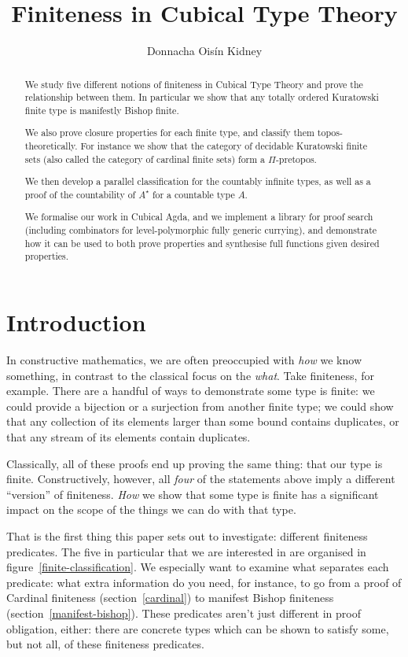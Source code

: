 
\title{Finiteness in Cubical Type Theory}
\author{Donnacha Oisín Kidney}

\maketitle
\begin{abstract}
  We study five different notions of finiteness in Cubical Type Theory and prove
  the relationship between them.
  In particular we show that any totally ordered Kuratowski finite type is
  manifestly Bishop finite.

  We also prove closure properties for each finite type, and classify them
  topos-theoretically.
  For instance we show that the category of decidable Kuratowski finite sets
  (also called the category of cardinal finite sets) form a \(\Pi\)-pretopos.

  We then develop a parallel classification for the countably infinite types, as
  well as a proof of the countability of \(A^\star\) for a countable type \(A\).

  We formalise our work in Cubical Agda, and we implement a library for proof
  search (including combinators for level-polymorphic fully generic currying),
  and demonstrate how it can be used to both prove properties and synthesise
  full functions given desired properties.
\end{abstract}
\section{Introduction}
In constructive mathematics, we are often preoccupied with \emph{how} we know
something, in contrast to the classical focus on the \emph{what}.
Take finiteness, for example.
There are a handful of ways to demonstrate some type is finite: we could provide
a bijection or a surjection from another finite type; we could show that any
collection of its elements larger than some bound contains duplicates, or that
any stream of its elements contain duplicates.

Classically, all of these proofs end up proving the same thing: that our type is
finite.
Constructively, however, all \emph{four} of the statements above imply a
different ``version'' of finiteness.
\emph{How} we show that some type is finite has a significant impact on the
scope of the things we can do with that type.

That is the first thing this paper sets out to investigate: different finiteness
predicates.
The five in particular that we are interested in are organised in
figure~\ref{finite-classification}.
We especially want to examine what separates each predicate: what extra
information do you need, for instance, to go from a proof of Cardinal finiteness
(section~\ref{cardinal}) to manifest Bishop finiteness
(section~\ref{manifest-bishop}).
These predicates aren't just different in proof obligation, either: there are
concrete types which can be shown to satisfy some, but not all, of these
finiteness predicates.

